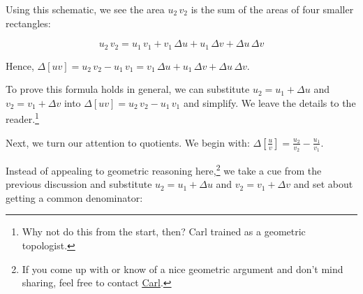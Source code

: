 \documentclass{ximera}
\begin{document}
\begin{center}


% 
  


\end{center}

Using this schematic, we see the area   $u_{2} \, v_{2}$ is the sum of the areas of four smaller rectangles:

\[ u_{2} \, v_{2}  = u_{1} \, v_{1} +  v_{1} \, \Delta u + u_{1} \, \Delta v + \Delta u \, \Delta v \]

Hence, $\Delta[uv]  = u_{2} \, v_{2} - u_{1} \, v_{1}  =  v_{1} \, \Delta u + u_{1} \, \Delta v +  \Delta u \, \Delta v$.

\medskip

To prove this formula holds in general, we can substitute $u_{2}  = u_{1} + \Delta u$ and $v_{2} = v_{1} + \Delta v$ into  $\Delta[uv] = u_{2} \, v_{2} - u_{1} \, v_{1}$ and simplify.  We leave the details to the reader.\footnote{Why not do this from the start, then?  Carl trained as a geometric topologist.}

\medskip

Next, we turn our attention to quotients.  We begin with: $\Delta \left[ \frac{u}{v} \right] = \frac{u_{2}}{v_{2}}  - \frac{u_{1}}{v_{1}}$.

\medskip

Instead of appealing to geometric reasoning here,\footnote{If you come up with or know of  a nice geometric argument and don't mind sharing, feel free to contact \href{mailto:carl@stitz-zeager.com}{\underline{Carl}}.} we take a cue from the previous discussion and substitute   $u_{2} = u_{1} + \Delta u$ and $v_{2} = v_{1} + \Delta v$ and set about getting a common denominator:
\end{document}
